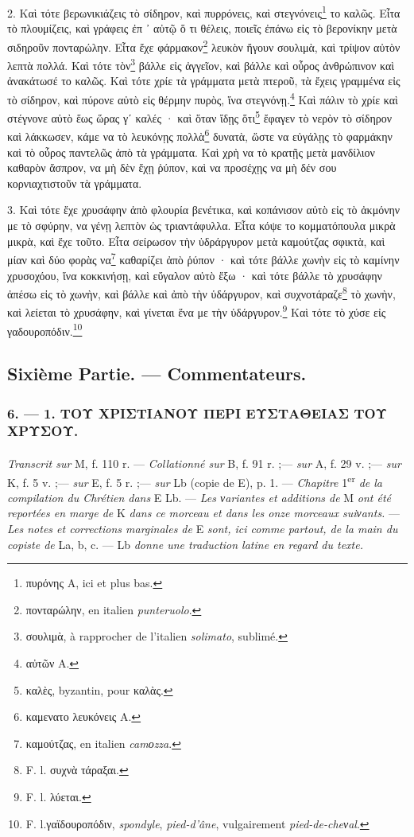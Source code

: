 \documentclass[a4paper, 11pt, oneside, polutonikogreek, french]{article}
\begin{document}
2. Καὶ τότε βερωνικιάζεις τὸ σίδηρον, καὶ πυρρόνεις, καὶ στεγνόνεις\footnote{πυρόνης A, ici et plus bas.} το καλῶς. Εἶτα τὸ πλουμίζεις, καὶ γράφεις ἐπ ᾽ αὐτῷ ὅ τι θέλεις, ποιεῖς ἐπάνω εἰς τὸ βερονίκην μετὰ σιδηροῦν πονταρώλην. Εἶτα ἔχε φάρμακον\footnote{πονταρώλην, en italien \emph{punteruolo}.} λευκὸν ἤγουν σουλιμὰ, καὶ τρίψον αὐτὸν λεπτὰ πολλά. Καὶ τότε τὸν\footnote{σουλιμὰ, à rapprocher de l'italien \emph{solimato}, sublimé.} βάλλε εἰς ἀγγεῖον, καὶ βάλλε καὶ οὖρος ἀνθρώπινον καὶ ἀνακάτωσέ το καλῶς. Καὶ τότε χρίε τὰ γράμματα μετὰ πτεροῦ, τὰ ἔχεις γραμμένα εἰς τὸ σίδηρον, καὶ πύρονε αὐτὸ εἰς θέρμην πυρὸς, ἵνα στεγνόνῃ.\footnote{αὐτῶν A.} Καὶ πάλιν τὸ χρίε καὶ στέγνονε αὐτὸ ἕως ὥρας γʹ καλές · καὶ ὅταν ἴδῃς ὅτι\footnote{καλὲς, byzantin, pour καλὰς.} ἔφαγεν τὸ νερὸν τὸ σίδηρον καὶ λάκκωσεν, κάμε να τὸ λευκόνῃς πολλὰ\footnote{καμενατο λευκόνεις A.} δυνατὰ, ὥστε να εὐγάλῃς τὸ φαρμάκην καὶ τὸ οὖρος παντελῶς ἀπὸ τὰ γράμματα. Καὶ χρὴ να τὸ κρατῇς μετὰ μανδίλιον καθαρὸν ἄσπρον, να μὴ δὲν ἔχῃ ῥύπον, καὶ να προσέχῃς να μὴ δέν σου κορνιαχτιστοῦν τὰ γράμματα.

3. Καὶ τότε ἔχε χρυσάφην ἀπὸ φλουρία βενέτικα, καὶ κοπάνισον αὐτὸ εἰς τὸ ἀκμόνην με τὸ σφύρην, να γένῃ λεπτὸν ὡς τριαντάφυλλα. Εἶτα κόψε το κομματόπουλα μικρὰ μικρὰ, καὶ ἔχε τοῦτο. Εἶτα σείρωσον τὴν ὑδράργυρον μετὰ καμούτζας σφικτὰ, καὶ μίαν καὶ δύο φορὰς να\footnote{καμούτζας, en italien \emph{camοzza}.} καθαρίζει ἀπὸ ῥύπον · καὶ τότε βάλλε χωνὴν εἰς τὸ καμίνην χρυσοχόου, ἵνα κοκκινήσῃ, καὶ εὔγαλον αὐτὸ ἔξω · καὶ τότε βάλλε τὸ χρυσάφην ἀπέσω εἰς τὸ χωνὴν, καὶ βάλλε καὶ ἀπὸ τὴν ὑδάργυρον, καὶ συχνοτάραζε\footnote{F. l. συχνὰ τάραξαι.} τὸ χωνὴν, καὶ λείεται τὸ χρυσάφην, καὶ γίνεται ἕνα με τὴν ὑδάργυρον.\footnote{F. l. λύεται.} Καὶ τότε τὸ χύσε εἰς γαδουροπόδιν.\footnote{F. l.γαϊδουροπόδιν, \emph{spondyle}, \emph{pied-d'âne}, vulgairement \emph{pied-de-cheνal}.}

\bigskip
\centerline{\EightStarTaper}
\centerline{\EightStarTaper\EightStarTaper}
\bigskip
\clearpage
\subsection{Sixième Partie. --- Commentateurs.}
\subsubsection{6. --- 1. ΤΟΥ ΧΡΙΣΤΙΑΝΟΥ ΠΕΡΙ ΕΥΣΤΑΘΕΙΑΣ ΤΟΥ ΧΡΥΣΟΥ.}
\paragraph{}
\emph{Transcrit sur} M, f. 110 r. --- \emph{Collationné sur} B, f. 91 r. ;--- \emph{sur} A, f. 29 v. ;--- \emph{sur} K, f. 5 v. ;--- \emph{sur} E, f. 5 r. ;--- \emph{sur} Lb (copie de E), p. 1. --- \emph{Chapitre} 1\textsuperscript{er} \emph{de la compilation du Chrétien dans} E Lb. --- \emph{Les νariantes et additions de} M \emph{ont été reportées en marge de} K \emph{dans ce morceau et dans les onze morceaux suiνants.} --- \emph{Les notes et corrections marginales de} E \emph{sont, ici comme partout, de la main du copiste de} La, b, c. --- Lb \emph{donne une traduction latine en regard du texte.}
\end{document}
